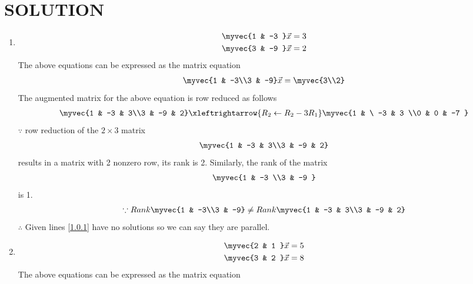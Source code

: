 \documentclass[journal,12pt,twocolumn]{IEEEtran}
\begin{document}
\section{SOLUTION}  
\begin{enumerate}
\item
\begin{align}
\begin{split}
\myvec{1 & -3 }\vec{x}&=3
\\
\myvec{3 & -9 }\vec{x}&=2
\end{split}
\end{align}
The above equations can be expressed as the matrix equation
\begin{align}
\myvec{1 & -3\\3 & -9} \vec{x} = \myvec{3\\2}
\end{align}
%
The augmented matrix for the above equation is row reduced as follows
\begin{align}
\myvec{1 & -3 & 3\\3 & -9 & 2} 
\xleftrightarrow {R_2\leftarrow R_2 -3R_1}\myvec{1 & \ -3 & 3 \\0 & 0 & -7 }
\end{align}
%
$\because$ row reduction of the $2\times 3$ matrix
%
\begin{align}
\myvec{1 & -3 & 3\\3 & -9 & 2} 
\end{align}
%
results in a matrix with 2 nonzero row, its rank is 2. 
%
Similarly, the rank of the matrix 
\begin{align}
\myvec{1 & -3 \\3 & -9 } 
\end{align}
%
is 1.
%
\begin{align}
\because Rank \myvec{1 & -3\\3 & -9} \ne Rank\myvec{1 & -3 & 3\\3 & -9 & 2} \nonumber\\
\end{align}
$\therefore$ Given lines \eqref{1.0.1} have no solutions so we can say they are parallel.
\item
\begin{align}
\begin{split}
\myvec{2 & 1 }\vec{x}&=5  
\\
\myvec{3 & 2 }\vec{x}&=8
\end{split}
\end{align}
The above equations can be expressed as the matrix equation
\begin{align}

\end{align}
\end{enumerate}
\end{document}
